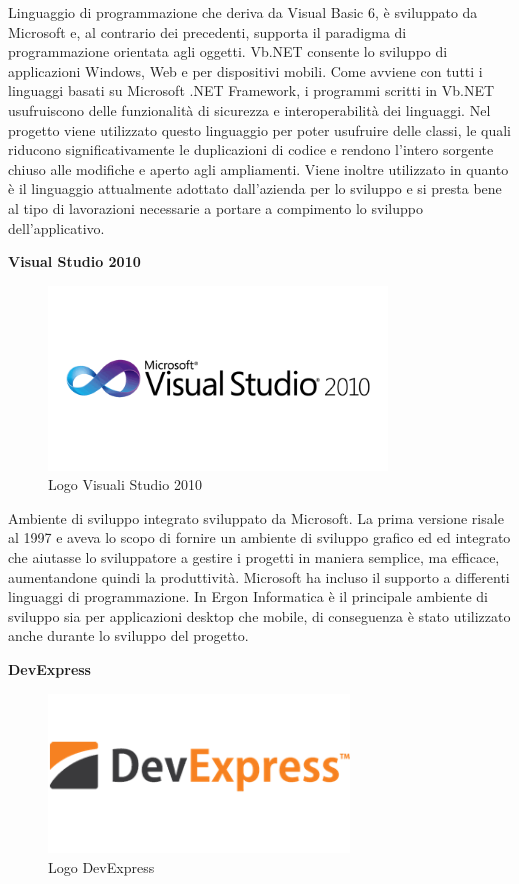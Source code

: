 Linguaggio di programmazione che deriva da Visual Basic 6, è sviluppato da Microsoft e, al contrario dei precedenti, supporta il paradigma di programmazione orientata agli oggetti.
Vb.NET consente lo sviluppo di applicazioni Windows, Web e per dispositivi mobili. 
Come avviene con tutti i linguaggi basati su Microsoft .NET Framework,
i programmi scritti in Vb.NET usufruiscono delle funzionalità di sicurezza e interoperabilità dei linguaggi.
Nel progetto viene utilizzato questo linguaggio per poter usufruire delle classi, le quali riducono significativamente le duplicazioni di codice e rendono l'intero sorgente 
chiuso alle modifiche e aperto agli ampliamenti. Viene inoltre utilizzato in quanto è il linguaggio attualmente adottato dall'azienda per lo sviluppo e si presta bene
al tipo di lavorazioni necessarie a portare a compimento lo sviluppo dell'applicativo.

\textbf{Visual Studio 2010}

\begin{figure}[H]
	\includegraphics[width=9cm]{immagini/microsoft-visual-studio-2010-logo.png}
	\centering
	\caption{Logo Visuali Studio 2010}
\end{figure}

Ambiente di sviluppo integrato sviluppato da Microsoft. 
La prima versione risale al 1997 e aveva lo scopo di fornire
un ambiente di sviluppo grafico ed  ed integrato che aiutasse lo sviluppatore a gestire i progetti in maniera semplice, ma efficace, aumentandone quindi la produttività.
Microsoft ha incluso il supporto a differenti linguaggi di programmazione.
In Ergon Informatica è il principale ambiente di sviluppo sia per applicazioni desktop che mobile, di conseguenza è stato utilizzato anche durante lo sviluppo del progetto.

\textbf{DevExpress}

\begin{figure}[H]
	\includegraphics[width=8cm]{immagini/devexpress.png}
	\centering
	\caption{Logo DevExpress}
\end{figure}

